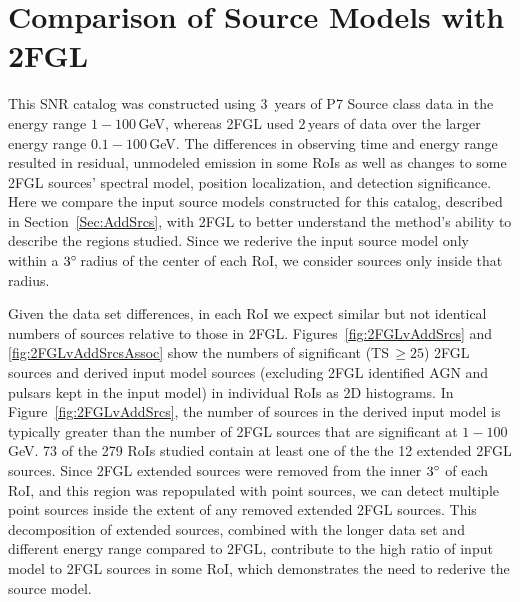 \section{Comparison of Source Models with 2FGL}
\label{appen:addSrcs2FGL}

This SNR catalog was constructed using $3$~years of P7 Source class data in the energy range $1-100$\,GeV, whereas 2FGL used $2$\,years of data over the larger energy range $0.1-100$\,GeV. The differences in observing time and energy range resulted in residual, unmodeled emission in some RoIs as well as changes to some 2FGL sources' spectral model, position localization, and detection significance. Here we compare the input source models constructed for this catalog, described in Section~\ref{Sec:AddSrcs}, with 2FGL to better understand the method's ability to describe the regions studied. Since we rederive the input source model only within a $3\mbox{$^\circ$}$\,radius of the center of each RoI, 
we consider sources only inside that radius.

Given the data set differences, in each RoI we expect similar but not identical numbers of sources relative to those in 2FGL.
Figures~\ref{fig:2FGLvAddSrcs} and \ref{fig:2FGLvAddSrcsAssoc} show the numbers of significant (TS\,$\geq 25$) 2FGL sources and derived input model sources (excluding 2FGL identified AGN and pulsars kept in the input model) in individual RoIs as 2D histograms. In Figure~\ref{fig:2FGLvAddSrcs}, 
the number of sources in the derived input model is typically greater than the number of 2FGL sources that are significant at $1-100$\,GeV. 73 of the 279 RoIs studied contain at least one of the the 12 extended 2FGL sources. Since 2FGL extended sources were removed from the inner $3\mbox{$^\circ$}$ of each RoI, and this region was repopulated with point sources, we can detect multiple point sources inside the extent of any removed extended 2FGL sources. This decomposition of extended sources, combined with the longer data set and different energy range compared to 2FGL, contribute to the high ratio of input model to 2FGL sources in some RoI, which demonstrates the need to rederive the source model. %

